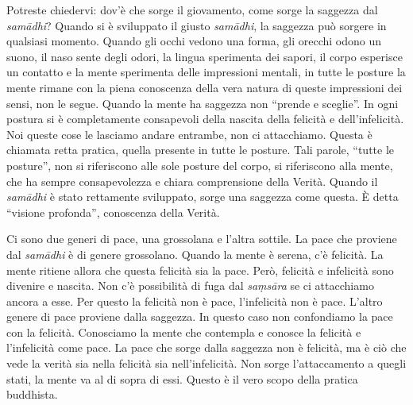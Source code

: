 Potreste chiedervi: dov'è che sorge il giovamento, come sorge la
saggezza dal \emph{samādhi}? Quando si è sviluppato il giusto
\emph{samādhi}, la saggezza può sorgere in qualsiasi momento. Quando gli
occhi vedono una forma, gli orecchi odono un suono, il naso sente degli
odori, la lingua sperimenta dei sapori, il corpo esperisce un contatto e
la mente sperimenta delle impressioni mentali, in tutte le posture la
mente rimane con la piena conoscenza della vera natura di queste
impressioni dei sensi, non le segue. Quando la mente ha saggezza non
``prende e sceglie''. In ogni postura si è completamente consapevoli
della nascita della felicità e dell'infelicità. Noi queste cose le
lasciamo andare entrambe, non ci attacchiamo. Questa è chiamata retta
pratica, quella presente in tutte le posture. Tali parole, ``tutte le
posture'', non si riferiscono alle sole posture del corpo, si
riferiscono alla mente, che ha sempre consapevolezza e chiara
comprensione della Verità. Quando il \emph{samādhi} è stato rettamente
sviluppato, sorge una saggezza come questa. È detta ``visione
profonda'', conoscenza della Verità.

Ci sono due generi di pace, una grossolana e l'altra sottile. La pace
che proviene dal \emph{samādhi} è di genere grossolano. Quando la mente
è serena, c'è felicità. La mente ritiene allora che questa felicità sia
la pace. Però, felicità e infelicità sono divenire e nascita. Non c'è
possibilità di fuga dal \emph{saṃsāra} se ci attacchiamo ancora a esse.
Per questo la felicità non è pace, l'infelicità non è pace. L'altro
genere di pace proviene dalla saggezza. In questo caso non confondiamo
la pace con la felicità. Conosciamo la mente che contempla e conosce la
felicità e l'infelicità come pace. La pace che sorge dalla saggezza non
è felicità, ma è ciò che vede la verità sia nella felicità sia
nell'infelicità. Non sorge l'attaccamento a quegli stati, la mente va al
di sopra di essi. Questo è il vero scopo della pratica buddhista.

